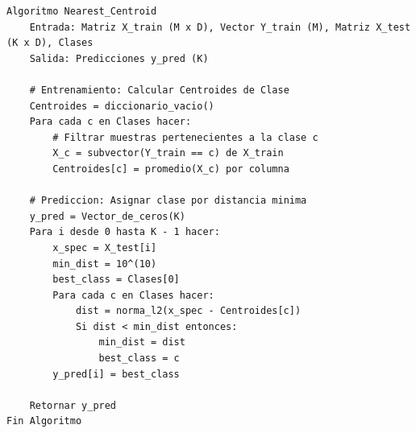 \begin{lstlisting}[caption=Entrenamiento y Prediccion del Clasificador de Centroide Mas Cercano]
Algoritmo Nearest_Centroid
    Entrada: Matriz X_train (M x D), Vector Y_train (M), Matriz X_test (K x D), Clases
    Salida: Predicciones y_pred (K)

    # Entrenamiento: Calcular Centroides de Clase
    Centroides = diccionario_vacio()
    Para cada c en Clases hacer:
        # Filtrar muestras pertenecientes a la clase c
        X_c = subvector(Y_train == c) de X_train
        Centroides[c] = promedio(X_c) por columna

    # Prediccion: Asignar clase por distancia minima
    y_pred = Vector_de_ceros(K)
    Para i desde 0 hasta K - 1 hacer:
        x_spec = X_test[i]
        min_dist = 10^(10)
        best_class = Clases[0]
        Para cada c en Clases hacer:
            dist = norma_l2(x_spec - Centroides[c])
            Si dist < min_dist entonces:
                min_dist = dist
                best_class = c
        y_pred[i] = best_class

    Retornar y_pred
Fin Algoritmo
\end{lstlisting}

